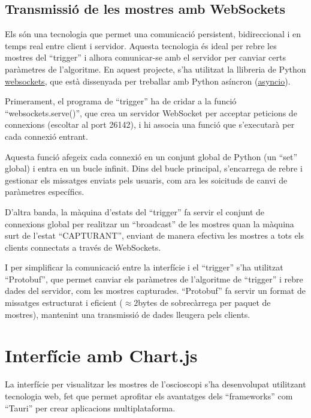 \documentclass{tfgitic}[2023/06/30]
\begin{document}
\subsection{Transmissió de les mostres amb WebSockets}

Els \cite[WebSockets]{websockets} són una tecnologia que permet una
comunicació persistent, bidireccional i en temps real entre client i
servidor. Aquesta tecnologia és ideal per rebre les mostres del
``trigger'' i alhora comunicar-se amb el servidor per canviar certs
paràmetres de l'algoritme. En aquest projecte, s'ha utilitzat la
llibreria de Python
\href{https://pypi.org/project/websockets/}{\underline{websockets}},
que està dissenyada per treballar amb Python asíncron
(\href{https://docs.python.org/3/library/asyncio.html}{\underline{asyncio}}).

Primerament, el programa de ``trigger'' ha de cridar a la funció
``websockets.serve()'', que crea un servidor WebSocket per acceptar
peticions de connexions (escoltar al port 26142), i hi associa una
funció que s'executarà per cada connexió entrant.

Aquesta funció afegeix cada connexió en un conjunt global de Python
(un ``set'' global) i entra en un bucle infinit. Dins del bucle
principal, s'encarrega de rebre i gestionar els missatges enviats pels
usuaris, com ara les so\lgem icituds de canvi de paràmetres
específics.

D'altra banda, la màquina d'estats del ``trigger'' fa servir el
conjunt de connexions global per realitzar un ``broadcast'' de les
mostres quan la màquina surt de l'estat ``CAPTURANT'', enviant de
manera efectiva les mostres a tots els clients connectats a través de
WebSockets.

I per simplificar la comunicació entre la interfície i el ``trigger''
s'ha utilitzat ``Protobuf'', que permet canviar els paràmetres de
l'algoritme de ``trigger'' i rebre dades del servidor, com les mostres
capturades. ``Protobuf'' fa servir un format de missatges estructurat
i eficient ($\approx 2$bytes de sobrecàrrega per paquet de mostres),
mantenint una transmissió de dades lleugera pels clients.

\section{Interfície amb Chart.js}

La interfície per visualitzar les mostres de l'osci\lgem oscopi s'ha
desenvolupat utilitzant tecnologia web, fet que permet aprofitar els
avantatges dels ``frameworks'' com ``Tauri'' per crear aplicacions
multiplataforma.
\end{document}
